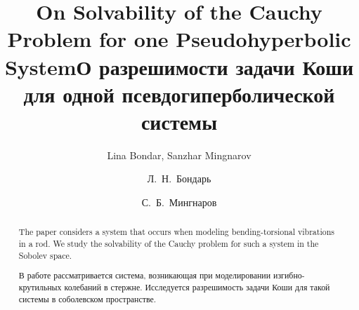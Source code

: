 \begin{englishtitle}
\title{On Solvability of the Cauchy Problem for one Pseudohyperbolic System}
\author{Lina Bondar,
Sanzhar Mingnarov}

\maketitle

\begin{abstract}
The paper considers a system that occurs when modeling bending-torsional vibrations in a rod.
We study the solvability of the Cauchy problem for such a system in the Sobolev space.

\end{abstract}
\end{englishtitle}


\iffalse
\documentclass[12pt]{llncs}
\usepackage[T2A]{fontenc}
\usepackage[utf8]{inputenc}
\usepackage[english,russian]{babel}
\usepackage[russian]{nla}




\fi

\title{О разрешимости задачи Коши для одной псевдогиперболической системы}
\author{Л.~Н.~Бондарь
  \and
  С.~Б.~Мингнаров
  \and
} %

\maketitle

\begin{abstract}
В работе рассматривается система, возникающая при моделировании изгибно-крутильных колебаний в стержне. 
Исследуется разрешимость задачи Коши для такой системы в соболевском пространстве.

\end{abstract}

